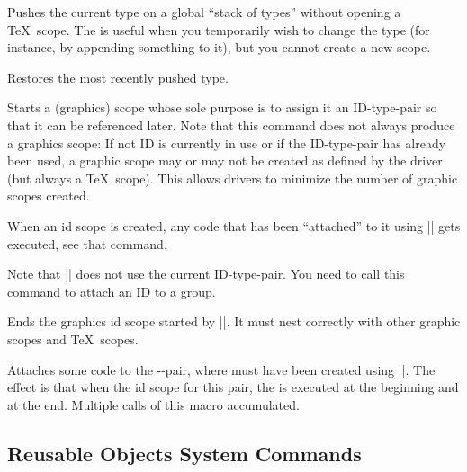 \begin{command}{\pgfsys@push@type}
  Pushes the current type on a global ``stack of types'' without
  opening a \TeX\ scope. The is useful when you temporarily wish to
  change the type (for instance, by appending something to it), but
  you cannot create a new scope.
\end{command}

\begin{command}{\pgfsys@pop@type}
  Restores the most recently pushed type.
\end{command}

\begin{command}{\pgfsys@begin@idscope}
  Starts a (graphics) scope whose sole purpose is to assign it an
  ID-type-pair so that it can be referenced later. Note that this
  command does not always produce a graphics scope: If not ID is
  currently in use or if the ID-type-pair has already been used,
  a graphic scope may or may not be created as defined by the driver
  (but always a \TeX\ scope). This allows drivers to minimize the
  number of graphic scopes created.

  When an id scope is created, any code that has been ``attached'' to
  it using |\pgfsys@attach@to@id| gets executed, see that command.

  Note that |\pgfsys@beginscope| does not use the current
  ID-type-pair. You need to call this command to attach an ID to a
  group. 
\end{command}

\begin{command}{\pgfsys@end@idscope}
  Ends the graphics id scope started by |\pgfsys@end@idscope|. It must
  nest correctly with other graphic scopes and \TeX\ scopes.
\end{command}


\begin{command}{\pgfsys@attach@to@id{}}
  Attaches some code to the --pair, where
   must have been created using |\pgfsys@new@id|. The effect
  is that when the id scope for this pair, the  is
  executed at the beginning and  at the end. Multiple
  calls of this macro accumulated.
\end{command}


\subsection{Reusable Objects System Commands}

